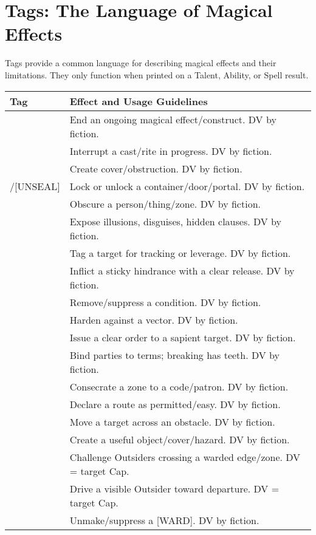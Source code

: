 \section*{Tags: The Language of Magical Effects}

Tags provide a common language for describing magical effects and their limitations. They only function when printed on a Talent, Ability, or Spell result.

\begin{fatebox}
\begin{tabularx}{\textwidth}{lX}
\toprule
\textbf{Tag} & \textbf{Effect and Usage Guidelines} \\
\midrule
[DISPEL] & End an ongoing magical effect/construct. DV by fiction. \\
[COUNTER] & Interrupt a cast/rite in progress. DV by fiction. \\
[BARRIER] & Create cover/obstruction. DV by fiction. \\
[SEAL]/[UNSEAL] & Lock or unlock a container/door/portal. DV by fiction. \\
[VEIL] & Obscure a person/thing/zone. DV by fiction. \\
[REVEAL] & Expose illusions, disguises, hidden clauses. DV by fiction. \\
[MARK] & Tag a target for tracking or leverage. DV by fiction. \\
[CURSE] & Inflict a sticky hindrance with a clear release. DV by fiction. \\
[CLEANSE] & Remove/suppress a condition. DV by fiction. \\
[FORTIFY] & Harden against a vector. DV by fiction. \\
[COMMAND] & Issue a clear order to a sapient target. DV by fiction. \\
[OATH] & Bind parties to terms; breaking has teeth. DV by fiction. \\
[SANCTIFY] & Consecrate a zone to a code/patron. DV by fiction. \\
[PASSAGE] & Declare a route as permitted/easy. DV by fiction. \\
[TRANSPORT] & Move a target across an obstacle. DV by fiction. \\
[CONJURE] & Create a useful object/cover/hazard. DV by fiction. \\
[WARD] & Challenge Outsiders crossing a warded edge/zone. DV = target Cap. \\
[BANISH] & Drive a visible Outsider toward departure. DV = target Cap. \\
[UNWARD] & Unmake/suppress a [WARD]. DV by fiction. \\
\bottomrule
\end{tabularx}
\end{fatebox}

